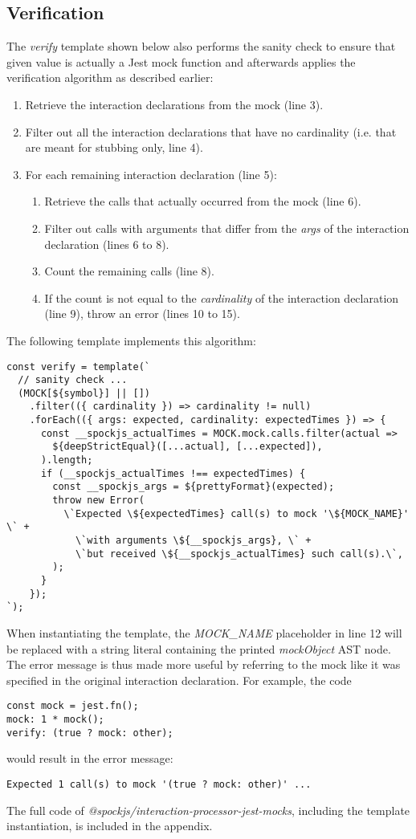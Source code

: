 \subsection{Verification}
The \textit{verify} template shown below also performs the sanity check
to ensure that given value is actually a Jest mock function
and afterwards applies the verification algorithm as described earlier:
\begin{enumerate}
  \item Retrieve the interaction declarations from the mock (line 3).
  \item Filter out all the interaction declarations that have no cardinality
    (i.e. that are meant for stubbing only, line 4).
  \item For each remaining interaction declaration (line 5):
    \begin{enumerate}
      \item Retrieve the calls that actually occurred from the mock (line 6).
      \item Filter out calls with arguments that differ from
        the \textit{args} of the interaction declaration (lines 6 to 8).
      \item Count the remaining calls (line 8).
      \item If the count is not equal to
        the \textit{cardinality} of the interaction declaration (line 9),
        throw an error (lines 10 to 15).
    \end{enumerate}
\end{enumerate}

The following template implements this algorithm:
\begin{verbatim}
const verify = template(`
  // sanity check ...
  (MOCK[${symbol}] || [])
    .filter(({ cardinality }) => cardinality != null)
    .forEach(({ args: expected, cardinality: expectedTimes }) => {
      const __spockjs_actualTimes = MOCK.mock.calls.filter(actual =>
        ${deepStrictEqual}([...actual], [...expected]),
      ).length;
      if (__spockjs_actualTimes !== expectedTimes) {
        const __spockjs_args = ${prettyFormat}(expected);
        throw new Error(
          \`Expected \${expectedTimes} call(s) to mock '\${MOCK_NAME}' \` +
            \`with arguments \${__spockjs_args}, \` +
            \`but received \${__spockjs_actualTimes} such call(s).\`,
        );
      }
    });
`);
\end{verbatim}

When instantiating the template,
the \textit{MOCK\_NAME} placeholder in line 12
will be replaced with a string literal
containing the printed
\textit{mockObject} AST node.
The error message is thus made more useful
by referring to the mock like it was specified
in the original interaction declaration.
For example, the code
\begin{verbatim}
const mock = jest.fn();
mock: 1 * mock();
verify: (true ? mock: other);
\end{verbatim}
would result in the error message:
\begin{verbatim}
Expected 1 call(s) to mock '(true ? mock: other)' ...
\end{verbatim}

The full code of \textit{@spockjs/interaction-processor-jest-mocks},
including the template instantiation,
is included in the appendix.
